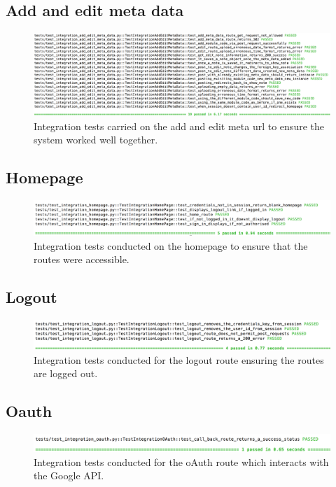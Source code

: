 \subsection{Add and edit meta data}
\begin{figure}[H]
  \centering
  \includegraphics[width=\textwidth]{images/test_integration_add_edit_meta_data}
  \caption{Integration tests carried on the add and edit meta url to ensure the system worked well together.}
  \label{fig:integration_add_edit}
\end{figure}

\subsection{Homepage}
\begin{figure}[H]
  \centering
  \includegraphics[width=\textwidth]{images/test_integration_homepage}
  \caption{Integration tests conducted on the homepage to ensure that the routes were accessible.}
  \label{fig:integration_homepage}
\end{figure}

\subsection{Logout}
\begin{figure}[H]
  \centering
  \includegraphics[width=\textwidth]{images/test_integration_logout}
  \caption{Integration tests conducted for the logout route ensuring the routes are logged out.}
  \label{fig:integration_logout}
\end{figure}

\subsection{Oauth}
\begin{figure}[H]
  \centering
  \includegraphics[width=\textwidth]{images/test_integration_oauth}
  \caption{Integration tests conducted for the oAuth route which interacts with the Google API.}
  \label{fig:integration_oauth}
\end{figure}

